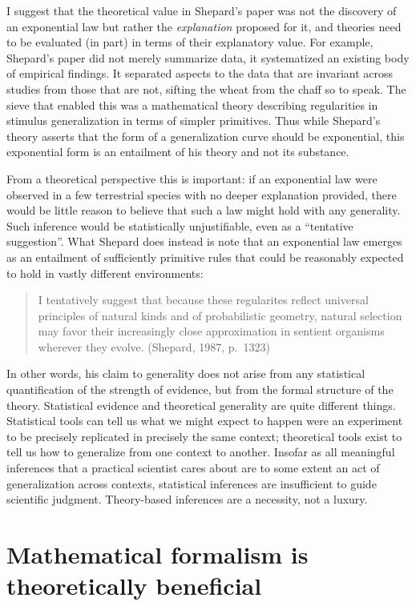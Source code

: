 \documentclass[
  english,
  doc]{apa6}
\begin{document}
I suggest that the theoretical value in Shepard's paper was not the discovery of an exponential law but rather the \emph{explanation} proposed for it, and theories need to be evaluated (in part) in terms of their explanatory value. For example, Shepard's paper did not merely summarize data, it systematized an existing body of empirical findings. It separated aspects to the data that are invariant across studies from those that are not, sifting the wheat from the chaff so to speak. The sieve that enabled this was a mathematical theory describing regularities in stimulus generalization in terms of simpler primitives. Thus while Shepard's theory asserts that the form of a generalization curve should be exponential, this exponential form is an entailment of his theory and not its substance.

From a theoretical perspective this is important: if an exponential law were observed in a few terrestrial species with no deeper explanation provided, there would be little reason to believe that such a law might hold with any generality. Such inference would be statistically unjustifiable, even as a \enquote{tentative suggestion}. What Shepard does instead is note that an exponential law emerges as an entailment of sufficiently primitive rules that could be reasonably expected to hold in vastly different environments:

\begin{quote}
I tentatively suggest that because these regularites reflect universal principles of natural kinds and of probabilistic geometry, natural selection may favor their increasingly close approximation in sentient organisms wherever they evolve. (Shepard, 1987, p.~1323)
\end{quote}

\noindent
In other words, his claim to generality does not arise from any statistical quantification of the strength of evidence, but from the formal structure of the theory. Statistical evidence and theoretical generality are quite different things. Statistical tools can tell us what we might expect to happen were an experiment to be precisely replicated in precisely the same context; theoretical tools exist to tell us how to generalize from one context to another. Insofar as all meaningful inferences that a practical scientist cares about are to some extent an act of generalization across contexts, statistical inferences are insufficient to guide scientific judgment. Theory-based inferences are a necessity, not a luxury.

\hypertarget{mathematical-formalism-is-theoretically-beneficial}{%
\section{Mathematical formalism is theoretically beneficial}\label{mathematical-formalism-is-theoretically-beneficial}}
\end{document}
